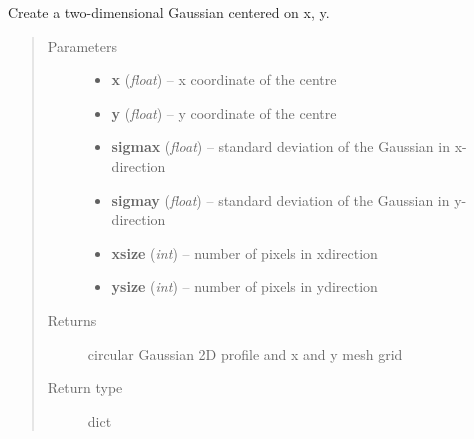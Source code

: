 \documentclass[a4paper,11pt,english]{sphinxmanual}
\begin{document}
\begin{fulllineitems}
\label{analysis:analysis.PSFcentroidingEffects.Gaussian2D}
Create a two-dimensional Gaussian centered on x, y.
\begin{quote}\begin{description}
\item[{Parameters}] \leavevmode\begin{itemize}
\item {} 
\textbf{x} (\emph{float}) -- x coordinate of the centre

\item {} 
\textbf{y} (\emph{float}) -- y coordinate of the centre

\item {} 
\textbf{sigmax} (\emph{float}) -- standard deviation of the Gaussian in x-direction

\item {} 
\textbf{sigmay} (\emph{float}) -- standard deviation of the Gaussian in y-direction

\item {} 
\textbf{xsize} (\emph{int}) -- number of pixels in xdirection

\item {} 
\textbf{ysize} (\emph{int}) -- number of pixels in ydirection

\end{itemize}

\item[{Returns}] \leavevmode
circular Gaussian 2D profile and x and y mesh grid

\item[{Return type}] \leavevmode
dict

\end{description}\end{quote}

\end{fulllineitems}

\end{document}

